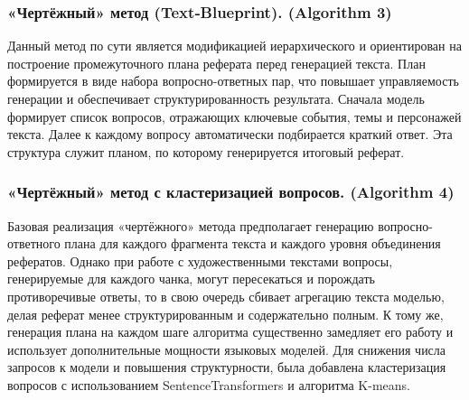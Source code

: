 \documentclass{article}
\begin{document}
\vspace{0.4em}
\subsubsection*{«Чертёжный» метод (Text‑Blueprint). (Algorithm 3)}
Данный метод \cite{blueprint} по сути является модификацией иерархического и ориентирован на построение промежуточного
плана реферата перед генерацией текста. 
План формируется в виде набора вопросно-ответных пар, что повышает управляемость генерации и обеспечивает структурированность результата.
Сначала модель формирует список вопросов, отражающих ключевые события, темы
и персонажей текста. Далее к каждому вопросу автоматически подбирается краткий
ответ. Эта структура служит планом, по которому генерируется итоговый реферат.


\subsubsection*{«Чертёжный» метод с кластеризацией вопросов. (Algorithm 4)}
Базовая реализация «чертёжного» метода предполагает генерацию вопросно-ответного
плана для каждого фрагмента текста и каждого уровня объединения рефератов. Однако при работе с художественными текстами вопросы, генерируемые для каждого чанка,
могут пересекаться и порождать противоречивые ответы,  то в свою очередь сбивает агрегацию текста моделью, делая реферат менее структурированным
и содержательно полным. К тому же, генерация плана на каждом шаге алгоритма существенно замедляет его работу и использует дополнительные мощности языковых моделей.
Для снижения числа запросов к модели и повышения структурности, была добавлена кластеризация вопросов с использованием SentenceTransformers и алгоритма K-means.
\end{document}
